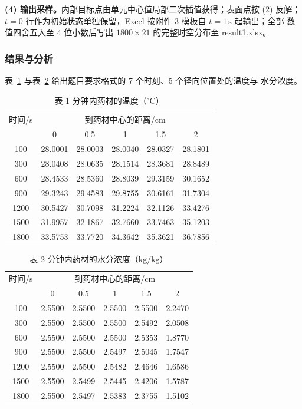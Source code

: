 \textbf{(4) 输出采样。}内部目标点由单元中心值局部二次插值获得；表面点按 (2) 反解；
$t=0$ 行作为初始状态单独保留，Excel 按附件 3 模板自 $t=1\,\mathrm{s}$ 起输出；全部
数值四舍五入至 4 位小数后写出 $1800\times21$ 的完整时空分布至 result1.xlsx。

\subsubsection{结果与分析}

表~\ref{tab:T1} 与表~\ref{tab:C1} 给出题目要求格式的 7 个时刻、5 个径向位置处的温度与
水分浓度。

\begin{table}[htbp]
  \centering
  \caption{表 1 分钟内药材的温度（$^{\circ}\mathrm{C}$）}
  \label{tab:T1}
  \begin{tabular}{cccccc}
    \hline
    时间/s & \multicolumn{5}{c}{到药材中心的距离/cm} \\
    & 0 & 0.5 & 1 & 1.5 & 2 \\
    \hline
    100   & 28.0001 & 28.0003 & 28.0040 & 28.0327 & 28.1801 \\
    300   & 28.0408 & 28.0635 & 28.1514 & 28.3681 & 28.8489 \\
    600   & 28.4533 & 28.5360 & 28.8039 & 29.3159 & 30.1652 \\
    900   & 29.3243 & 29.4583 & 29.8755 & 30.6161 & 31.7304 \\
    1200  & 30.5427 & 30.7098 & 31.2224 & 32.1126 & 33.4276 \\
    1500  & 31.9957 & 32.1867 & 32.7660 & 33.7463 & 35.1203 \\
    1800  & 33.5753 & 33.7720 & 34.3642 & 35.3621 & 36.7856 \\
    \hline
  \end{tabular}
\end{table}

\begin{table}[htbp]
  \centering
  \caption{表 2 分钟内药材的水分浓度（$\mathrm{kg/kg}$）}
  \label{tab:C1}
  \begin{tabular}{cccccc}
    \hline
    时间/s & \multicolumn{5}{c}{到药材中心的距离/cm} \\
    & 0 & 0.5 & 1 & 1.5 & 2 \\
    \hline
    100   & 2.5500 & 2.5500 & 2.5500 & 2.5500 & 2.2470 \\
    300   & 2.5500 & 2.5500 & 2.5500 & 2.5492 & 2.0508 \\
    600   & 2.5500 & 2.5500 & 2.5500 & 2.5353 & 1.8770 \\
    900   & 2.5500 & 2.5500 & 2.5497 & 2.5045 & 1.7547 \\
    1200  & 2.5500 & 2.5500 & 2.5482 & 2.4646 & 1.6586 \\
    1500  & 2.5500 & 2.5499 & 2.5445 & 2.4206 & 1.5787 \\
    1800  & 2.5500 & 2.5497 & 2.5383 & 2.3755 & 1.5102 \\
    \hline
  \end{tabular}
\end{table}


